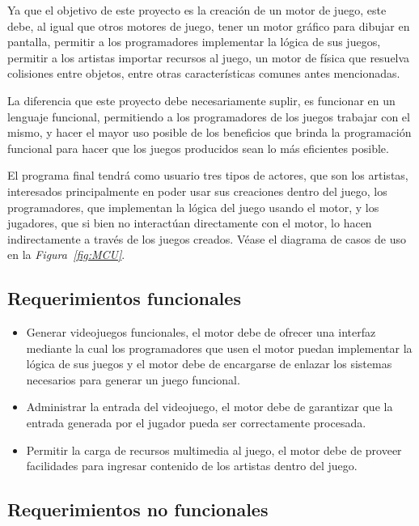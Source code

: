 Ya que el objetivo de este proyecto es la creación de un motor de juego, este debe, al igual que otros motores de juego, tener un motor gráfico para dibujar en pantalla, permitir a los programadores implementar la lógica de sus juegos, permitir a los artistas importar recursos al juego, un motor de física que resuelva colisiones entre objetos, entre otras características comunes antes mencionadas.

La diferencia que este proyecto debe necesariamente suplir, es funcionar en un lenguaje funcional, permitiendo a los programadores de los juegos trabajar con el mismo, y hacer el mayor uso posible de los beneficios que brinda la programación funcional para hacer que los juegos producidos sean lo más eficientes posible.

El programa final tendrá como usuario tres tipos de actores, que son los artistas, interesados principalmente en poder usar sus creaciones dentro del juego, los programadores, que implementan la lógica del juego usando el motor, y los jugadores, que si bien no interactúan directamente con el motor, lo hacen indirectamente a través de los juegos creados. Véase el diagrama de casos de uso en la \emph{Figura~\ref{fig:MCU}}.

\subsection{Requerimientos funcionales}

\begin{itemize}
  \item Generar videojuegos funcionales, el motor debe de ofrecer una interfaz mediante la cual los programadores que usen el motor puedan implementar la lógica de sus juegos y el motor debe de encargarse de enlazar los sistemas necesarios para generar un juego funcional.
  \item Administrar la entrada del videojuego, el motor debe de garantizar que la entrada generada por el jugador pueda ser correctamente procesada.
  \item Permitir la carga de recursos multimedia al juego, el motor debe de proveer facilidades para ingresar contenido de los artistas dentro del juego.
\end{itemize}

\subsection{Requerimientos no funcionales}

